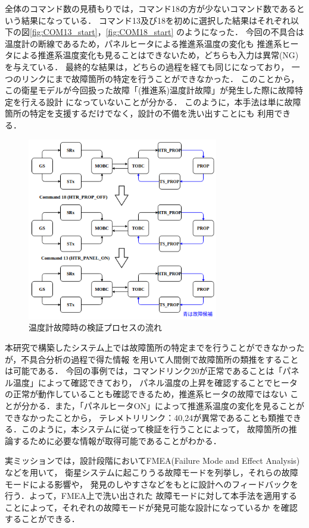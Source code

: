 \documentclass[11pt]{jsreport}
\begin{document}
全体のコマンド数の見積もりでは，コマンド18の方が少ないコマンド数であるという結果になっている．
コマンド13及び18を初めに選択した結果はそれぞれ以下の図\ref{fig:COM13_start}，\ref{fig:COM18_start}
のようになった．
今回の不具合は温度計の断線であるため，パネルヒータによる推進系温度の変化も
推進系ヒータによる推進系温度変化も見ることはできないため，どちらも入力は異常(NG)を与えている．
最終的な結果は，どちらの過程を経ても同じになっており，
一つのリンクにまで故障箇所の特定を行うことができなかった．
このことから，この衛星モデルが今回扱った故障「(推進系)温度計故障」が発生した際に故障特定を行える設計
になっていないことが分かる．
このように，本手法は単に故障箇所の特定を支援するだけでなく，設計の不備を洗い出すことにも
利用できる．

\begin{figure}[H]
   \centering
      \includegraphics[height=8.0cm]{figure/COM_process_TS_fault.png}
      \caption{温度計故障時の検証プロセスの流れ}
      \label{fig:COM_process_TS_fault}
\end{figure}

本研究で構築したシステム上では故障箇所の特定までを行うことができなかったが，不具合分析の過程で得た情報
を用いて人間側で故障箇所の類推をすることは可能である．
今回の事例では，コマンドリンク20が正常であることは「パネル温度」によって確認できており，
パネル温度の上昇を確認することでヒータの正常が動作していることも確認できるため，推進系ヒータの故障ではない
ことが分かる．また，「パネルヒータON」によって推進系温度の変化を見ることができなかったことから，
テレメトリリンク：40,24が異常であることも類推できる．このように，本システムに従って検証を行うことによって，
故障箇所の推論するために必要な情報が取得可能であることがわかる．

実ミッションでは，設計段階においてFMEA(Failure Mode and Effect Analysis)などを用いて，
衛星システムに起こりうる故障モードを列挙し，それらの故障モードによる影響や，
発見のしやすさなどをもとに設計へのフィードバックを行う．よって，FMEA上で洗い出された
故障モードに対して本手法を適用することによって，それぞれの故障モードが発見可能な設計になっているか
を確認することができる．
\end{document}
